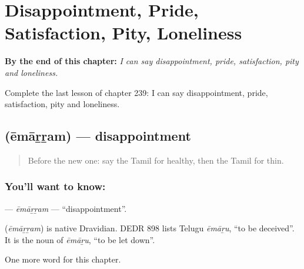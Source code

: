 
\chapter{Disappointment, Pride, Satisfaction, Pity, Loneliness}
\label{ch:ta-disappointment-pride-satisfaction-pity-loneliness}

\begin{chapteropening}
\textbf{By the end of this chapter:} \emph{I can say disappointment, pride, satisfaction, pity and loneliness.}

Complete the last lesson of chapter 239: I can say disappointment, pride, satisfaction, pity and loneliness.
\end{chapteropening}

\section[\texorpdfstring{\ta{ஏமாற்றம்} (ēmāṟṟam)}{ஏமாற்றம் (ēmāṟṟam)}]{ (ēmāṟṟam) — disappointment}

\label{lesson:TA-C239-emarram}



\begin{quote}
Before the new one: say the Tamil for healthy, then the Tamil for thin.
\end{quote}

\subsection*{You'll want to know: }
\textbf{} — \emph{ēmāṟṟam} — \textquotedblleft{}disappointment\textquotedblright{}.

\begin{cousinweb}
\textbf{} (\emph{ēmāṟṟam}) is native Dravidian. DEDR 898 lists Telugu \emph{ēmāṟu}, \textquotedblleft{}to be deceived\textquotedblright{}. It is the noun of \emph{ēmāṟu}, \textquotedblleft{}to be let down\textquotedblright{}.
\end{cousinweb}

\begin{grammarlens}[title={What you've built}]
One more word for this chapter.
\end{grammarlens}

